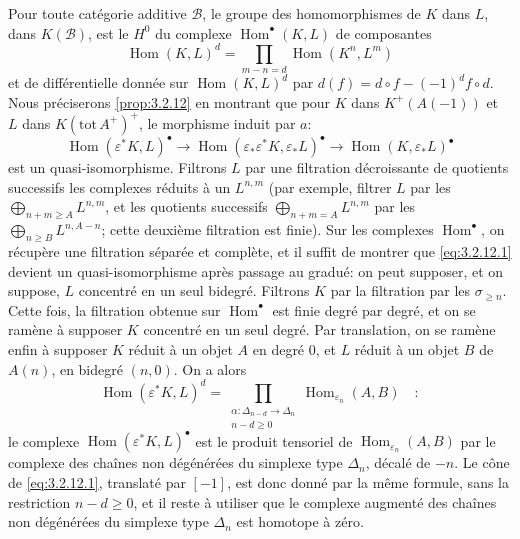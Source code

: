 \documentclass[12pt,a4paper]{article}
\theoremstyle{plain}
\theoremstyle{definition}
\DeclareMathOperator{\Hom}{Hom}
\newcommand{\cB}{\mathcal{B}}
\providecommand{\cB}{\mathcal{B}}
\providecommand{\Hom}{\operatorname{Hom}}
\begin{document}
Pour toute cat\'{e}gorie additive $\cB$, le groupe des homomorphismes de $K$ dans $L$, dans $K(\cB)$, est le $H^{0}$ du complexe $\Hom^{\bullet}(K,L)$ de composantes
\[
\Hom(K,L)^{d} = \prod_{m-n=d} \Hom(K^{n}, L^{m})
\]
et de diff\'{e}rentielle donn\'{e}e sur $\Hom(K,L)^{d}$ par $d(f) = d \circ f - (-1)^{d} f \circ d$. Nous pr\'{e}ciserons \ref{prop:3.2.12} en montrant que pour $K$ dans $K^{+}(A(-1))$ et $L$ dans $K(\mathrm{tot}\, A^{+})^{+}$, le morphisme induit par $a$:
\begin{equation}\label{eq:3.2.12.1}
\Hom(\varepsilon^{*}K, L)^{\bullet} \longrightarrow \Hom(\varepsilon_{*}\varepsilon^{*}K, \varepsilon_{*}L)^{\bullet} \longrightarrow \Hom(K, \varepsilon_{*}L)^{\bullet}
\end{equation}
est un quasi-isomorphisme. Filtrons $L$ par une filtration d\'{e}croissante de quotients successifs les complexes r\'{e}duits \`{a} un $L^{n,m}$ (par exemple, filtrer $L$ par les $\bigoplus_{n+m \geq A} L^{n,m}$, et les quotients successifs $\bigoplus_{n+m=A} L^{n,m}$ par les $\bigoplus_{n \geq B} L^{n,A-n}$; cette deuxi\`{e}me filtration est finie). Sur les complexes $\Hom^{\bullet}$, on r\'{e}cup\`{e}re une filtration s\'{e}par\'{e}e et compl\`{e}te, et il suffit de montrer que \eqref{eq:3.2.12.1} devient un quasi-isomorphisme apr\`{e}s passage au gradu\'{e}: on peut supposer, et on suppose, $L$ concentr\'{e} en un seul bidegr\'{e}. Filtrons $K$ par la filtration par les $\sigma_{\geq n}$. Cette fois, la filtration obtenue sur $\Hom^{\bullet}$ est finie degr\'{e} par degr\'{e}, et on se ram\`{e}ne \`{a} supposer $K$ concentr\'{e} en un seul degr\'{e}. Par translation, on se ram\`{e}ne enfin \`{a} supposer $K$ r\'{e}duit \`{a} un objet $A$ en degr\'{e} $0$, et $L$ r\'{e}duit \`{a} un objet $B$ de $A(n)$, en bidegr\'{e} $(n,0)$. On a alors
\[
\Hom(\varepsilon^{*}K, L)^{d} = \prod_{\substack{\alpha: \Delta_{n-d} \to \Delta_{n} \\ n-d \geq 0}} \Hom_{\varepsilon_{n}}(A, B)\quad:
\]
le complexe $\Hom(\varepsilon^{*}K, L)^{\bullet}$ est le produit tensoriel de $\Hom_{\varepsilon_{n}}(A,B)$ par le complexe des cha\^{i}nes non d\'{e}g\'{e}n\'{e}r\'{e}es du simplexe type $\Delta_{n}$, d\'{e}cal\'{e} de $-n$. Le c\^{o}ne de \eqref{eq:3.2.12.1}, translat\'{e} par $[-1]$, est donc donn\'{e} par la m\^{e}me formule, sans la restriction $n-d \geq 0$, et il reste \`{a} utiliser que le complexe augment\'{e} des cha\^{i}nes non d\'{e}g\'{e}n\'{e}r\'{e}es du simplexe type $\Delta_{n}$ est homotope \`{a} z\'{e}ro.
\end{document}
